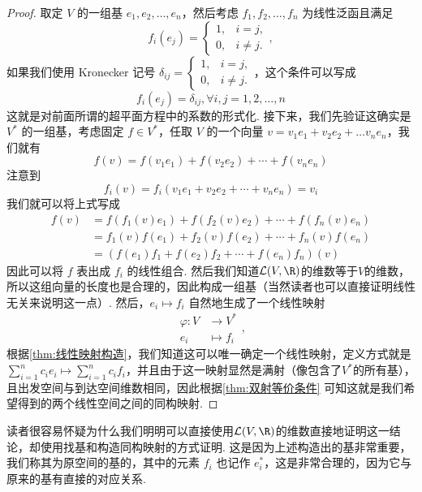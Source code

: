 \begin{proof}
    取定 $V$ 的一组基 $e_1, e_2, \ldots, e_n$，然后考虑 $f_1, f_2, \ldots, f_n$ 为线性泛函且满足
    \[f_i(e_j) = \begin{cases}
            1, & i = j,    \\
            0, & i \neq j.
        \end{cases},\]
    如果我们使用 Kronecker 记号 $\delta_{ij}=\begin{cases}
            1, & i = j,    \\
            0, & i \neq j.
        \end{cases}$，这个条件可以写成
    \[f_i(e_j) = \delta_{ij}, \forall i, j = 1, 2, \ldots, n\]
    这就是对前面所谓的超平面方程中的系数的形式化. 接下来，我们先验证这确实是 $V^*$ 的一组基，考虑固定 $f \in V^*$，任取 $V$ 的一个向量 $v = v_1 e_1 + v_2 e_2 + \ldots v_n e_n$，我们就有
    \[f(v) = f(v_1 e_1) + f(v_2 e_2) + \cdots + f(v_n e_n)\]
    注意到
    \[f_i(v) = f_i (v_1 e_1 + v_2 e_2 + \cdots + v_n e_n) = v_i\]
    我们就可以将上式写成
    \begin{align*}
        f(v) & = f(f_1(v) e_1) + f(f_2(v) e_2) + \cdots + f(f_n(v) e_n) \\
             & = f_1(v) f(e_1) + f_2(v) f(e_2) + \cdots + f_n(v) f(e_n) \\
             & = (f(e_1) f_1 + f(e_2) f_2 + \cdots + f(e_n) f_n)(v)
    \end{align*}
    因此可以将 $f$ 表出成 $f_i$ 的线性组合. 然后我们知道$\mathcal{L}(V, \R)$的维数等于$V$的维数，所以这组向量的长度也是合理的，因此构成一组基（当然读者也可以直接证明线性无关来说明这一点）. 然后，$e_i \mapsto f_i$ 自然地生成了一个线性映射
    \begin{equation*}
        \begin{aligned}
            \varphi: V & \to V^*     \\
            e_i        & \mapsto f_i
        \end{aligned},
    \end{equation*}
    根据\autoref{thm:线性映射构造}，我们知道这可以唯一确定一个线性映射，定义方式就是$\sum_{i=1}^nc_ie_i \mapsto\sum_{i=1}^nc_if_i$，并且由于这一映射显然是满射（像包含了$V^*$的所有基），且出发空间与到达空间维数相同，因此根据\autoref{thm:双射等价条件} 可知这就是我们希望得到的两个线性空间之间的同构映射.
\end{proof}

读者很容易怀疑为什么我们明明可以直接使用$\mathcal{L}(V, \R)$的维数直接地证明这一结论，却使用找基和构造同构映射的方式证明. 这是因为上述构造出的基非常重要，我们称其为原空间的基的，其中的元素 $f_i$ 也记作 $e^*_i$，这是非常合理的，因为它与原来的基有直接的对应关系.

